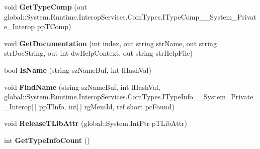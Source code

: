 \begin{DoxyCompactItemize}
void {\bfseries Get\+Type\+Comp} (out global\+::\+System.\+Runtime.\+Interop\+Services.\+Com\+Types.\+I\+Type\+Comp\+\_\+\+\_\+\+System\+\_\+\+Private\+\_\+\+Interop pp\+T\+Comp)
\item 
\mbox{\label{interface_system_1_1_runtime_1_1_interop_services_1_1_com_types_1_1_i_type_lib_____system___private___interop_aff9e8eca4346610e25643d0f21d2bb4f}} 
void {\bfseries Get\+Documentation} (int index, out string str\+Name, out string str\+Doc\+String, out int dw\+Help\+Context, out string str\+Help\+File)
\item 
\mbox{\label{interface_system_1_1_runtime_1_1_interop_services_1_1_com_types_1_1_i_type_lib_____system___private___interop_a3dbf23af652bedf5fa2f224e41e467d9}} 
bool {\bfseries Is\+Name} (string sz\+Name\+Buf, int l\+Hash\+Val)
\item 
\mbox{\label{interface_system_1_1_runtime_1_1_interop_services_1_1_com_types_1_1_i_type_lib_____system___private___interop_a8b02e80b39806b510da13271024c7b50}} 
void {\bfseries Find\+Name} (string sz\+Name\+Buf, int l\+Hash\+Val, global\+::\+System.\+Runtime.\+Interop\+Services.\+Com\+Types.\+I\+Type\+Info\+\_\+\+\_\+\+System\+\_\+\+Private\+\_\+\+Interop\mbox{[}$\,$\mbox{]} pp\+T\+Info, int\mbox{[}$\,$\mbox{]} rg\+Mem\+Id, ref short pc\+Found)
\item 
\mbox{\label{interface_system_1_1_runtime_1_1_interop_services_1_1_com_types_1_1_i_type_lib_____system___private___interop_a35bcf4ef9e11f232d8be78df4d98603f}} 
void {\bfseries Release\+T\+Lib\+Attr} (global\+::\+System.\+Int\+Ptr p\+T\+Lib\+Attr)
\item 
\mbox{\label{interface_system_1_1_runtime_1_1_interop_services_1_1_com_types_1_1_i_type_lib_____system___private___interop_a2698e0279128bfafc4c5f48be7a1e066}} 
int {\bfseries Get\+Type\+Info\+Count} ()

\end{DoxyCompactItemize}

